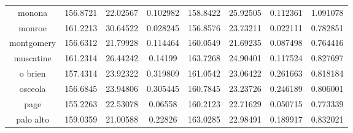 \begin{table}[H]
\begin{tabular}{|c|ccc|ccc|c|}
monona        & 156.8721 & 22.02567       & 0.102982 & 158.8422 & 25.92505       & 0.112361 & 1.091078 \\
monroe        & 161.2213 & 30.64522       & 0.028245 & 156.8576 & 23.73211       & 0.022111 & 0.782851 \\
montgomery    & 156.6312 & 21.79928       & 0.114464 & 160.0549 & 21.69235       & 0.087498 & 0.764416 \\
muscatine     & 161.2314 & 26.44242       & 0.14199  & 163.7268 & 24.90401       & 0.117524 & 0.827697 \\
o brien       & 157.4314 & 23.92322       & 0.319809 & 161.0542 & 23.06422       & 0.261663 & 0.818184 \\
osceola       & 156.6845 & 23.94806       & 0.305445 & 160.7845 & 23.23726       & 0.246189 & 0.806001 \\
page          & 155.2263 & 22.53078       & 0.06558  & 160.2123 & 22.71629       & 0.050715 & 0.773339 \\
palo alto     & 159.0359 & 21.00588       & 0.22826  & 163.0285 & 22.98491       & 0.189917 & 0.832021 \\
\hline
\end{tabular}
\end{table}




